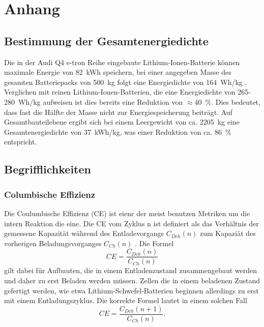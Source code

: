 \chapter{\label{ch:anhang} Anhang}

\section{\label{ch:AudiEnergie}Bestimmung der Gesamtenergiedichte}

Die in der Audi Q4 e-tron Reihe eingebaute Lithium-Ionen-Batterie können maximale Energie von 82~kWh speichern, bei einer angegeben Masse des gesamten Batteriepacks von 500~kg folgt eine Energiedichte von 164~Wh/kg \cite{Radu2021,Audi2022}. Verglichen mit reinen Lithium-Ionen-Batterien, die eine Energiedichte von 265-280~Wh/kg \cite{Armand2020} aufweisen ist dies bereits eine Reduktion von $\approx 40$~\%. Dies bedeutet, dass fast die Hälfte der Masse nicht zur Energiespeicherung beiträgt. Auf Gesamtbauteilebene ergibt sich bei einem Leergewicht von ca. 2205~kg \cite{Audi2022} eine Gesamtenergiedichte von 37~kWh/kg, was einer Reduktion von ca. 86~\% entspricht.

\section{Begrifflichkeiten}

\subsection{Columbische Effizienz}
Die Coulumbische Effizienz (CE) ist eienr der meist benutzen Metriken um die intern Reaktion die eine. Die CE vom Zyklus n ist definiert als das Verhältnis der gemessene Kapazität während des Entladevorgangs $C_{Dch}(n)$ zum Kapaziät des vorherigen Beladungsvorganges $C_{Ch}(n)$ \cite{Tornheim2020}.
Die Formel
\begin{equation}
CE = \frac{C_{Dch}(n)}{C_{Ch}(n)}
\end{equation}
gilt dabei für Aufbauten, die in einem Entladenzustand zusammengebaut werden und daher zu erst Beladen werden müssen. Zellen die in einem beladenen Zustand gefertigt werden, wie etwa Lithium-Schwefel-Batterien beginnen allerdings zu erst mit einem Entladungszyklus. Die korrekte Formel lautet in einem solchen Fall
\begin{equation}
    CE = \frac{C_{Dch}(n+1)}{C_{Ch}(n)}.
\end{equation}

